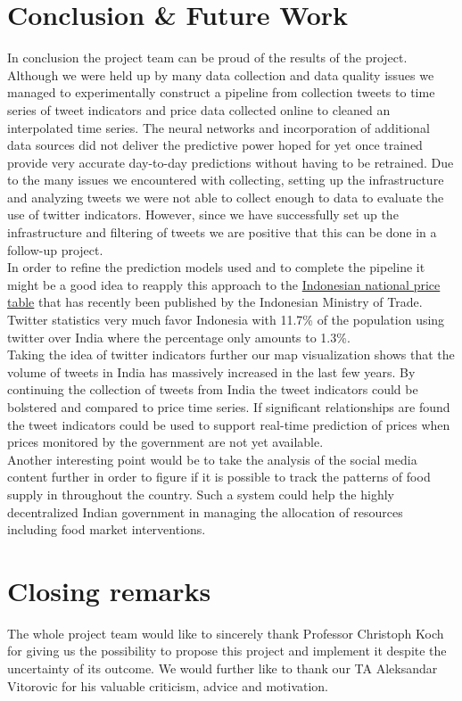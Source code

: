 \section*{Conclusion \& Future Work}
In conclusion the project team can be proud of the results of the project. Although we were held up by many data collection and data quality issues we managed to experimentally construct a pipeline from collection tweets to time series of tweet indicators and price data collected online to cleaned an interpolated time series. The neural networks and incorporation of additional data sources did not deliver the predictive power hoped for yet once trained provide very accurate day-to-day predictions without having to be retrained. Due to the many issues we encountered with collecting, setting up the infrastructure and analyzing tweets we were not able to collect enough to data to evaluate the use of twitter indicators. However, since we have successfully set up the infrastructure and filtering of tweets we are positive that this can be done in a follow-up project.\\
In order to refine the prediction models used and to complete the pipeline it might be a good idea to reapply this approach to the \href{http://www.kemendag.go.id/en/economic-profile/prices/national-price-table}{Indonesian national price table} that has recently been published by the Indonesian Ministry of Trade. Twitter statistics very much favor Indonesia with 11.7\% of the population using twitter over India where the percentage only amounts to 1.3\%.\\
Taking the idea of twitter indicators further our map visualization shows that the volume of tweets in India has massively increased in the last few years. By continuing the collection of tweets from India the tweet indicators could be bolstered and compared to price time series. If significant relationships are found the tweet indicators could be used to support real-time prediction of prices when prices monitored by the government are not yet available.\\
Another interesting point would be to take the analysis of the social media content further in order to figure if it is possible to track the patterns of food supply in throughout the country. Such a system could help the highly decentralized Indian government in managing the allocation of resources including food market interventions.

\section*{Closing remarks}
The whole project team would like to sincerely thank Professor Christoph Koch for giving us the possibility to propose this project and implement it despite the uncertainty of its outcome. We would further like to thank our TA Aleksandar Vitorovic for his valuable criticism, advice and motivation.
